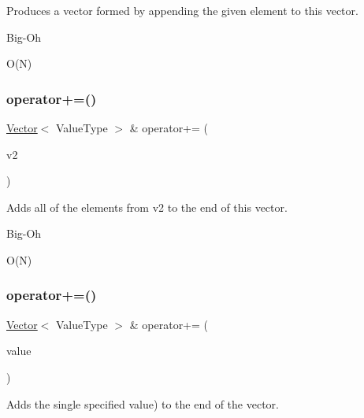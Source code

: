 Produces a vector formed by appending the given element to this vector. 

\begin{DoxyRefDesc}{Big-\/\+Oh}
\item[\mbox{\hyperlink{BigOh__BigOh000138}{Big-\/\+Oh}}]O(\+N) \end{DoxyRefDesc}
\mbox{\label{classVector_a6b35f98e0e64a2fff6891a8806f640fd}} 
\subsubsection{\texorpdfstring{operator+=()}{operator+=()}\hspace{0.1cm}{\footnotesize\ttfamily [1/2]}}
{\footnotesize\ttfamily \mbox{\hyperlink{classVector}{Vector}}$<$ Value\+Type $>$ \& operator+= (\begin{DoxyParamCaption}\item[{const \mbox{\hyperlink{classVector}{Vector}}$<$ Value\+Type $>$ \&}]{v2 }\end{DoxyParamCaption})}



Adds all of the elements from {\ttfamily v2} to the end of this vector. 

\begin{DoxyRefDesc}{Big-\/\+Oh}
\item[\mbox{\hyperlink{BigOh__BigOh000139}{Big-\/\+Oh}}]O(\+N) \end{DoxyRefDesc}
\mbox{\label{classVector_afded71b2a6d6df8b0257cbfd8f7e8d5f}} 
\subsubsection{\texorpdfstring{operator+=()}{operator+=()}\hspace{0.1cm}{\footnotesize\ttfamily [2/2]}}
{\footnotesize\ttfamily \mbox{\hyperlink{classVector}{Vector}}$<$ Value\+Type $>$ \& operator+= (\begin{DoxyParamCaption}\item[{const Value\+Type \&}]{value }\end{DoxyParamCaption})}



Adds the single specified value) to the end of the vector. 

